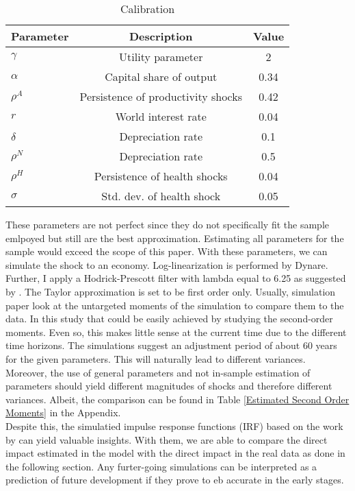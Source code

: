 \documentclass{article}
\begin{document}
\begin{table}[htbp]\centering \caption{Calibration \label{Calibration}}
\begin{tabular}{l c c}\hline\hline
Parameter & Description & Value \\ \hline
$\gamma$ & Utility parameter & 2 \\
$\alpha$ & Capital share of output & 0.34 \\
$\rho^A$ & Persistence of productivity shocks & 0.42 \\
$r$ & World interest rate & 0.04 \\
$\delta$ & Depreciation rate & 0.1 \\
$\rho^N$ & Depreciation rate & 0.5 \\
$\rho^H$ & Persistence of health shocks & 0.04 \\
$\sigma$ & Std. dev. of health shock & 0.05 \\ \hline
\end{tabular}
\end{table}
These parameters are not perfect since they do not specifically fit the sample emlpoyed but still are the best approximation. Estimating all parameters for the sample would exceed the scope of this paper.
With these parameters, we can simulate the shock to an economy. Log-linearization is performed by Dynare. Further, I apply a Hodrick-Prescott filter with lambda equal to 6.25 as suggested by \cite{ravn2002adjusting}. The Taylor approximation is set to be first order only. Usually, simulation paper look at the untargeted moments of the simulation to compare them to the data. In this study that could be easily achieved by studying the second-order moments. Even so, this makes little sense at the current time due to the different time horizons. The simulations suggest an adjustment period of about 60 years for the given parameters. This will naturally lead to different variances. Moreover, the use of general parameters and not in-sample estimation of parameters should yield different magnitudes of shocks and therefore different variances. Albeit, the comparison can be found in Table \ref{Estimated Second Order Moments} in the Appendix. \\
Despite this, the simulatied impulse response functions (IRF) based on the work by \cite{jorda2005estimation} can yield valuable insights.
With them, we are able to compare the direct impact estimated in the model with the direct impact in the real data as done in the following section. Any furter-going simulations can be interpreted as a prediction of future development if they prove to eb accurate in the early stages.\\
\end{document}
